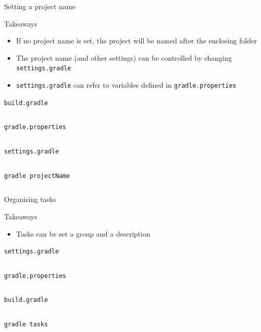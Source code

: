 \documentclass[presentation]{beamer}
\newcommand{\codefile}[4]{
	\begin{block}{\texttt{#2}}
		\inputminted[fontsize=#3,linenos=true,breaklines=true]{#4}{"workspace/#1/#2"}
	\end{block}
}
\newcommand{\groovy}[3]{\codefile{#1}{#2}{#3}{groovy}}
\newcommand{\terminal}[3]{\codefile{#1}{#2}{#3}{text}}
\newcommand{\tinier}{\fontsize{4pt}{5pt}\selectfont}
\begin{document}
\begin{frame}{Setting a project name}
    \begin{block}{Takeaways}
        \begin{itemize}
            \item If no project name is set, the project will be named after the enclosing folder            \item The project name (and other settings) can be controlled by changing \texttt{settings.gradle}
            \item \texttt{settings.gradle} can refer to variables defined in \texttt{gradle.properties}
        \end{itemize}
    \end{block}
    \groovy{10-ProjectName}{build.gradle}{\scriptsize}
    \terminal{10-ProjectName}{gradle.properties}{\scriptsize}
    \terminal{10-ProjectName}{settings.gradle}{\scriptsize}
    \terminal{10-ProjectName}{gradle projectName}{\scriptsize}
\end{frame}

\begin{frame}{Organising tasks}
    \begin{block}{Takeaways}
        \begin{itemize}
            \item Tasks can be set a group and a description
        \end{itemize}
    \end{block}
    \terminal{11-TaskDescription}{settings.gradle}{\scriptsize}
    \terminal{11-TaskDescription}{gradle.properties}{\scriptsize}
    \groovy{11-TaskDescription}{build.gradle}{\scriptsize}
    \terminal{11-TaskDescription}{gradle tasks}{\tinier}
\end{frame}
\end{document}
